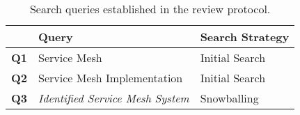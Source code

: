 \begin{table}[t]
\centering
    \begin{tabularx}{\linewidth}{lXl}
    \toprule
     & Query & Search Strategy \\
    
    \midrule
    \textbf{Q1} & Service Mesh & Initial Search \\
    \textbf{Q2} & Service Mesh Implementation & Initial Search \\

    \midrule
    \textbf{Q3} & \textit{Identified Service Mesh System} & Snowballing  \\
    
    \bottomrule
    \end{tabularx}
\caption[Search queries established in the review protocol.]{Search queries established in the review protocol.}
\label{tab:search-queries}
\end{table}

    

    
